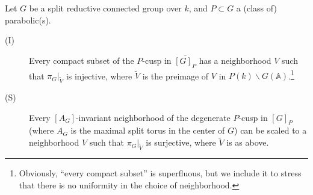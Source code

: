 \begin{theorem}
 \label{theorem-reduction-theory-split}
Let $G$ be a split reductive connected group over $k$, and $P\subset G$ a (class of) parabolic(s).
 \begin{description}
  \item[(I)] Every compact subset of the $P$-cusp in $\overline{[G]_P}$ has a neighborhood $V$ such that $\pi_G|_{\tilde V}$ is injective, where $\tilde V$ is the preimage of $V$ in $P(k)\backslash G(\mathbb A)$.\footnote{Obviously, ``every compact subset'' is superfluous, but we include it to stress that there is no uniformity in the choice of neighborhood.}
  \item[(S)] Every $[A_G]$-invariant neighborhood of the degenerate $P$-cusp in $[G]_P$ (where $A_G$ is the maximal split torus in the center of $G$) can be scaled to a neighborhood $V$ such that $\pi_G|_{\tilde V}$ is surjective, where $\tilde V$ is as above. 
 \end{description}
\end{theorem}


